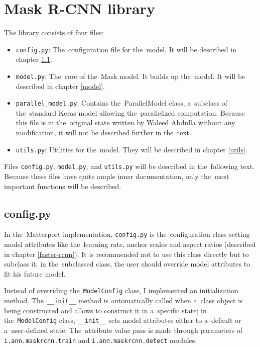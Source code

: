 \section{Mask R-CNN library}
\label{library}

The library consists of four files:
\begin{itemize}
	 \item \verb|config.py|: The~configuration file for the~model. It will be
	 described in chapter \ref{config}.
	 \item \verb|model.py|: The~core of the~Mask  model. It builds up
	 the~model. It will be described in chapter \ref{model}.
	 \item \verb|parallel_model.py|: Contains the~ParallelModel class, a~subclass
	 of the~standard Keras model allowing the~parallelized computation. Because
	 this file is in the~original state written by Waleed Abdulla without any
	 modification, it will not be described further in the~text.
	 \item \verb|utils.py|: Utilities for the~model. They will be described in
	 chapter \ref{utils}.
\end{itemize}

Files \verb|config.py|, \verb|model.py|, and \verb|utils.py| will be described 
in the~following text. Because these files have quite ample inner documentation, 
only the~most important functions will be described.

\subsection{config.py}
\label{config}

In the~Matterport implementation, \verb|config.py| is the~configuration class 
setting model attributes like the~learning rate,  anchor scales and 
aspect ratios (described in chapter \ref{faster-rcnn}). It is recommended not to 
use this class directly but to subclass it; in the~subclassed class, the user should 
override model attributes to fit his future model.

Instead of overriding the~\verb|ModelConfig| class, I implemented an 
initialization method. The~\verb|__init__| method is automatically called when
a~class object is being constructed and allows to construct it in a~specific 
state; in the~\verb|ModelConfig| class, \verb|__init__| sets model attributes 
either to a~default or a~user-defined state. The~attribute value pass is made 
through parameters of \verb|i.ann.maskrcnn.train| and \verb|i.ann.maskrcnn.detect| 
modules.

